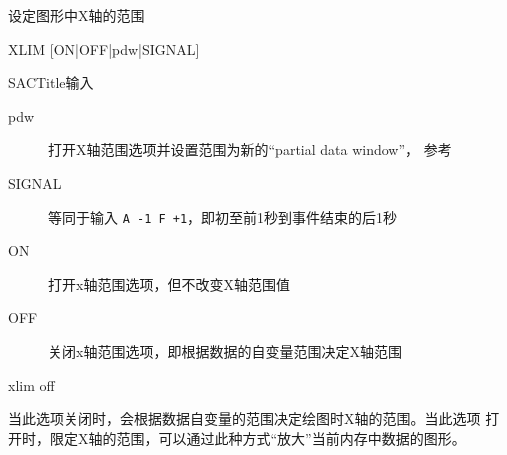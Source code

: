 \label{cmd:xlim}

设定图形中X轴的范围

\begin{SACSTX}
XLIM [ON|OFF|pdw|SIGNAL]
\end{SACSTX}

SACTitle{输入}
\begin{description}
\item [pdw] 打开X轴范围选项并设置范围为新的``partial data window''，
    参考 
\item [SIGNAL] 等同于输入 \texttt{A -1 F +1}，即初至前1秒到事件结束的后1秒
\item [ON] 打开x轴范围选项，但不改变X轴范围值
\item [OFF] 关闭x轴范围选项，即根据数据的自变量范围决定X轴范围
\end{description}

\begin{SACDFT}
xlim off
\end{SACDFT}

当此选项关闭时，会根据数据自变量的范围决定绘图时X轴的范围。当此选项
打开时，限定X轴的范围，可以通过此种方式``放大''当前内存中数据的图形。
